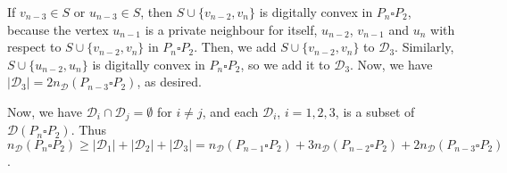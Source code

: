 \documentclass[12pt]{article}
\begin{document}
If $v_{n-3}\in S$ or $u_{n-3}\in S$, then $S\cup\{v_{n-2},v_n\}$ is digitally convex in $P_n\square P_2$, because the vertex $u_{n-1}$ is a private neighbour for itself, $u_{n-2}$, $v_{n-1}$ and $u_n$ with respect to $S\cup\{v_{n-2},v_n\}$ in $P_n\square P_2$. Then, we add $S\cup\{v_{n-2},v_n\}$ to $\mathscr{D}_3$. Similarly, $S\cup\{u_{n-2},u_n\}$ is digitally convex in $P_n\square P_2$, so we add it to $\mathscr{D}_3$. Now, we have $|\mathscr{D}_3| = 2n_\mathscr{D}(P_{n-3}\square P_2)$, as desired.  

Now, we have $\mathscr{D}_i \cap \mathscr{D}_j=\emptyset$ for $i\neq j$, and each $\mathscr{D}_i$, $i=1,2,3$, is a subset of $\mathscr{D}(P_n\square P_2)$. Thus $n_\mathscr{D}(P_n\square P_2) \geq |\mathscr{D}_1| + |\mathscr{D}_2| + |\mathscr{D}_3| = n_\mathscr{D}(P_{n-1}\square P_2)+3n_\mathscr{D}(P_{n-2}\square P_2)+2n_\mathscr{D}(P_{n-3}\square P_2)$.
\end{document}
